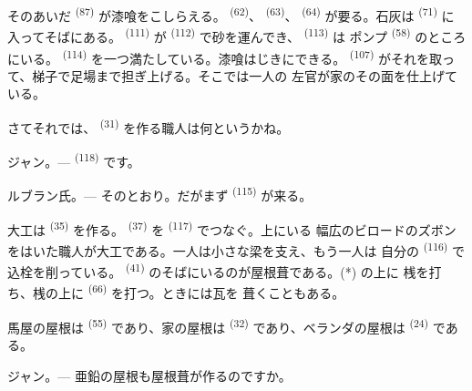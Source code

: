 そのあいだ \textsuperscript{(87)} が漆喰をこしらえる。
 \textsuperscript{(62)}、 \textsuperscript{(63)}、
 \textsuperscript{(64)} が要る。石灰は \textsuperscript{(71)}
に入ってそばにある。 \textsuperscript{(111)} が
\textsuperscript{(112)} で砂を運んでき、 \textsuperscript{(113)} は
ポンプ \textsuperscript{(58)} のところにいる。 \textsuperscript{(114)}
を一つ満たしている。漆喰はじきにできる。
\textsuperscript{(107)} がそれを取って、梯子で足場まで担ぎ上げる。そこでは一人の
左官が家のその面を仕上げている。

さてそれでは、 \textsuperscript{(31)} を作る職人は何というかね。

\textsc{ジャン}。---  \textsuperscript{(118)} です。

\VUsaut{3.0mm}
\VUsaut{3.0mm}

\textsc{ルブラン氏}。--- そのとおり。だがまず \textsuperscript{(115)}
が来る。

大工は \textsuperscript{(35)} を作る。
\textsuperscript{(37)} を \textsuperscript{(117)} でつなぐ。上にいる
幅広のビロードのズボンをはいた職人が大工である。一人は小さな梁を支え、もう一人は
自分の \textsuperscript{(116)} で込栓を削っている。
\textsuperscript{(41)} のそばにいるのが屋根葺である。(*) の上に
桟を打ち、桟の上に \textsuperscript{(66)} を打つ。ときには瓦を
葺くこともある。


馬屋の屋根は \textsuperscript{(55)} であり、家の屋根は
 \textsuperscript{(32)} であり、ベランダの屋根は
\textsuperscript{(24)} である。

\textsc{ジャン}。--- 亜鉛の屋根も屋根葺が作るのですか。

